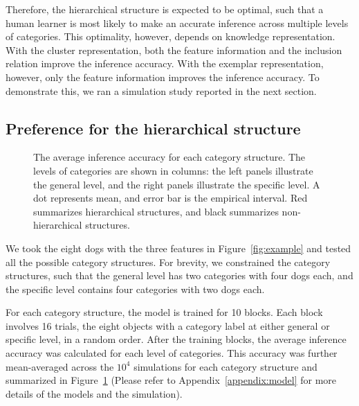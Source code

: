 \documentclass[doc]{apa6}
\begin{document}
Therefore, the hierarchical structure is expected to be optimal, such that a human learner is most
likely to make an accurate inference across multiple levels of categories. This optimality, however,
depends on knowledge representation. With the cluster representation, both the feature information
and the inclusion relation improve the inference accuracy. With the exemplar representation,
however, only the feature information improves the inference accuracy. To demonstrate this, we ran a
simulation study reported in the next section.


\subsection*{Preference for the hierarchical structure}

\begin{figure}[t!]
    \centering



    \caption{The average inference accuracy for each category structure. The levels of categories
    are shown in columns: the left panels illustrate the general level, and the right panels
    illustrate the specific level.  A dot represents mean, and error bar is the empirical interval.
    Red summarizes hierarchical structures, and black summarizes non-hierarchical structures.}

\label{fig:result}
\end{figure}

We took the eight dogs with the three features in Figure~\ref{fig:example} and tested all the
possible category structures. For brevity, we constrained the category structures, such that the
general level has two categories with four dogs each, and the specific level contains four
categories with two dogs each.

For each category structure, the model is trained for 10 blocks. Each block involves 16 trials, the
eight objects with a category label at either general or specific level, in a random order. After
the training blocks, the average inference accuracy was calculated for each level of categories.
This accuracy was further mean-averaged across the $10^{4}$ simulations for each category structure
and summarized in Figure~\ref{fig:result} (Please refer to Appendix~\ref{appendix:model} for more
details of the models and the simulation).
\end{document}
